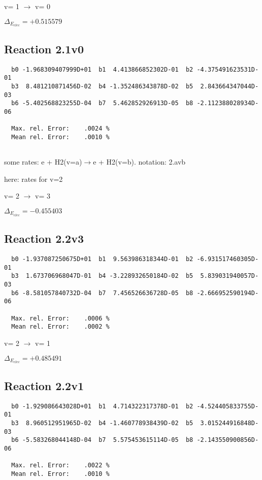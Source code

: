 \documentclass[12pt]{article}
\begin{document}
  v=  1 $\rightarrow$ v= 0

$\Delta_{E_{elec}}=+0.515579$

\subsection{
Reaction 2.1v0
}

\begin{small}\begin{verbatim}
  b0 -1.968309407999D+01  b1  4.413866852302D-01  b2 -4.375491623531D-01
  b3  8.481210871456D-02  b4 -1.352486343878D-02  b5  2.843664347044D-03
  b6 -5.402568823255D-04  b7  5.462852926913D-05  b8 -2.112388028934D-06

  Max. rel. Error:    .0024 %
  Mean rel. Error:    .0010 %


\end{verbatim}\end{small}
\newpage
some rates: e + H2(v=a)$\rightarrow$e + H2(v=b). notation: 2.avb

here: rates for v=2

  v=  2 $\rightarrow$ v= 3

$\Delta_{E_{elec}}=-0.455403$

\subsection{
Reaction 2.2v3
}


\begin{small}\begin{verbatim}
  b0 -1.937087250675D+01  b1  9.563986318344D-01  b2 -6.931517460305D-01
  b3  1.673706968047D-01  b4 -3.228932650184D-02  b5  5.839031940057D-03
  b6 -8.581057840732D-04  b7  7.456526636728D-05  b8 -2.666952590194D-06

  Max. rel. Error:    .0006 %
  Mean rel. Error:    .0002 %

\end{verbatim}\end{small}

  v=  2 $\rightarrow$ v= 1

$\Delta_{E_{elec}}=+0.485491$

\subsection{
Reaction 2.2v1
}


\begin{small}\begin{verbatim}
  b0 -1.929086643028D+01  b1  4.714322317378D-01  b2 -4.524405833755D-01
  b3  8.960512951965D-02  b4 -1.460778938439D-02  b5  3.015244916848D-03
  b6 -5.583268044148D-04  b7  5.575453615114D-05  b8 -2.143550900856D-06

  Max. rel. Error:    .0022 %
  Mean rel. Error:    .0010 %


\end{verbatim}\end{small}
\end{document}
